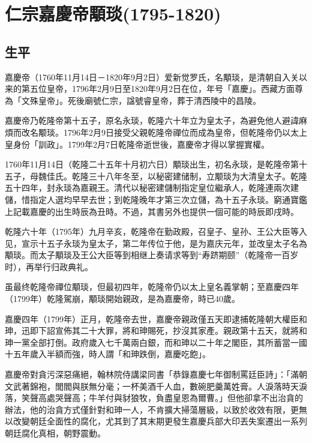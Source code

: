 
\section{仁宗嘉慶帝顒琰\tiny(1795-1820)}

\subsection{生平}

嘉慶帝（1760年11月14日－1820年9月2日）爱新觉罗氏，名顒琰，是清朝自入关以来的第五位皇帝，1796年2月9日至1820年9月2日在位，年号「嘉慶」。西藏方面尊為「文殊皇帝」。死後廟號仁宗，諡號睿皇帝，葬于清西陵中的昌陵。

嘉慶帝乃乾隆帝第十五子，原名永琰，乾隆六十年立为皇太子，為避免他人避諱麻煩而改名颙琰。1796年2月9日接受父親乾隆帝禪位而成為皇帝，但乾隆帝仍以太上皇身份「訓政」。1799年2月7日乾隆帝逝世後，嘉慶帝才得以掌握實權。

1760年11月14日（乾隆二十五年十月初六日）顒琰出生，初名永琰，是乾隆帝第十五子，母魏佳氏。乾隆三十八年冬至，以秘密建储制，立颙琰为大清皇太子。乾隆五十四年，封永琰為嘉親王。清代以秘密建儲制指定皇位繼承人，乾隆連兩次建儲，惜指定人選均早早去世；到乾隆晚年才第三次立儲，為十五子永琰。窮通寶鑑上記載嘉慶的出生時辰為丑時。不過，其書另外也提供一個可能的時辰即戌時。

乾隆六十年（1795年）九月辛亥，乾隆帝在勤政殿，召皇子、皇孙、王公大臣等入见，宣示十五子永琰为皇太子，第二年传位于他，是为嘉庆元年，並改皇太子名為顒琰。而太子顒琰及王公大臣等到相继上奏请求等到“寿跻期颐”（乾隆帝一百岁时），再举行归政典礼。

虽最终乾隆帝禪位顒琰，但最初四年，乾隆帝仍以太上皇名義掌朝；至嘉慶四年（1799年）乾隆駕崩，顒琰開始親政，是為嘉慶帝，時已40歲。

嘉慶四年（1799年）正月，乾隆帝去世，嘉慶帝親政僅五天即逮捕乾隆朝大權臣和珅，迅即下詔宣佈其二十大罪，將和珅賜死，抄沒其家產。親政第十五天，就將和珅一黨全部打倒。政府歲入七千萬兩白銀，而和珅以二十年之閣臣，其所蓄當一國十五年歲入半額而強，時人謂「和珅跌倒，嘉慶吃飽」。

嘉慶帝對貪污深惡痛絕，翰林院侍講梁同書「恭錄嘉慶七年御制罵廷臣詩」：「滿朝文武著錦袍，閭閻與朕無分毫；一杯美酒千人血，數碗肥羹萬姓膏。人淚落時天淚落，笑聲高處哭聲高；牛羊付與豺狼牧，負盡皇恩為爾曹。」但他卻拿不出治貪的辦法，他的治貪方式僅針對和珅一人，不肯擴大掃蕩層級，以致於收效有限，更無以改變朝廷全面性的腐化，尤其到了其末期更發生嘉慶兵部大印丟失案遷出一系列朝廷腐化真相，朝野震動。

